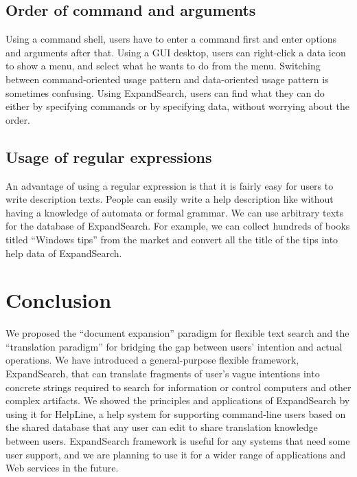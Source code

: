 \documentclass[manuscript,anonymous,review]{acmart}
\def\HL{\textsf{HelpLine}}
\def\ES{\textsf{ExpandSearch}}
\begin{document}
\subsection*{Order of command and arguments}

Using a command shell,
users have to enter a command first and enter options and arguments after that.
Using a GUI desktop,
users can right-click a data icon to show a menu,
and select what he wants to do from the menu.
Switching between command-oriented usage pattern and
data-oriented usage pattern is sometimes confusing.
Using {\ES}, users can find what they can do
either by specifying commands or by specifying data, 
without worrying about the order.

\subsection*{Usage of regular expressions}

An advantage of using a regular expression is that
it is fairly easy for users to write description texts.
People can easily write a help description like
without having a knowledge of automata or formal grammar.
We can use arbitrary texts for the database of {\ES}.
For example,
we can collect hundreds of books titled ``Windows tips'' from the market
and convert all the title of the tips into help data of {\ES}.

\section{Conclusion}

We proposed the ``document expansion'' paradigm for
flexible text search and
the ``translation paradigm'' for bridging the gap between
users' intention and actual operations.
%
We have introduced a general-purpose flexible framework, {\ES},
that can translate fragments of user's vague intentions into
concrete strings required to search for information or
control computers and other complex artifacts.
We showed the principles and applications of {\ES} by using it
for {\HL}, a help system for supporting command-line users
based on the shared database that any user can edit to share
translation knowledge between users.
%
{\ES} framework is useful for any systems that need
some user support, and we are planning to use it
for a wider range of applications and Web services in the future.

% 
% 


\newpage



\end{document}
